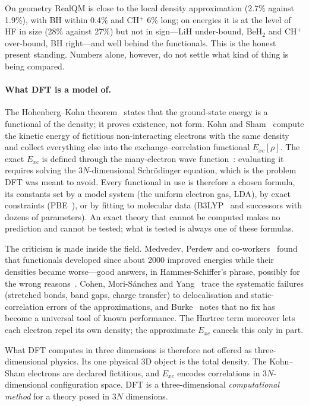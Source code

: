 On geometry RealQM is close to the local density approximation (2.7\% against 1.9\%), with BH within
0.4\% and CH$^+$ 6\% long; on energies it is at the level of HF in size (28\% against 27\%) but not in
sign---LiH under-bound, BeH$_2$ and CH$^+$ over-bound, BH right---and well behind the functionals. This is the honest present standing.
Numbers alone, however, do not settle what kind of thing is being compared.

\paragraph{What DFT is a model of.}
The Hohenberg--Kohn theorem~\cite{hk} states that the ground-state energy is a functional of the
density; it proves existence, not form. Kohn and Sham~\cite{ks} compute the kinetic energy of fictitious
non-interacting electrons with the same density and collect everything else into the
exchange--correlation functional $E_{xc}[\rho]$. The exact $E_{xc}$ is defined through the many-electron
wave function~\cite{levy}: evaluating it requires solving the $3N$-dimensional Schr\"odinger equation,
which is the problem DFT was meant to avoid. Every functional in use is therefore a chosen formula, its
constants set by a model system (the uniform electron gas, LDA), by exact constraints (PBE~\cite{pbe}),
or by fitting to molecular data (B3LYP~\cite{b3lyp} and successors with dozens of parameters). An exact
theory that cannot be computed makes no prediction and cannot be tested; what is tested is always one
of these formulas.

The criticism is made inside the field. Medvedev, Perdew and co-workers~\cite{medvedev} found that
functionals developed since about 2000 improved energies while their densities became worse---good
answers, in Hammes-Schiffer's phrase, possibly for the wrong reasons~\cite{hammes}. Cohen, Mori-S\'anchez
and Yang~\cite{cohen} trace the systematic failures (stretched bonds, band gaps, charge transfer) to
delocalisation and static-correlation errors of the approximations, and Burke~\cite{burke} notes that
no fix has become a universal tool of known performance. The Hartree term moreover lets each electron
repel its own density; the approximate $E_{xc}$ cancels this only in part.

What DFT computes in three dimensions is therefore not offered as three-dimensional physics. Its one
physical 3D object is the total density. The Kohn--Sham electrons are declared fictitious, and $E_{xc}$
encodes correlations in $3N$-dimensional configuration space. DFT is a three-dimensional
\emph{computational method} for a theory posed in $3N$ dimensions.

